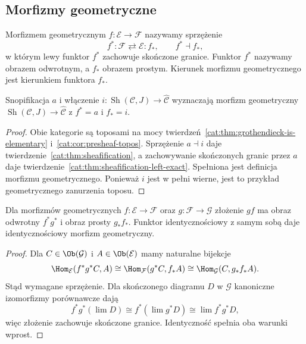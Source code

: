 \subsection{Morfizmy geometryczne}

\begin{definicja}\label{cat:def:geometric-morphism}
Morfizmem geometrycznym $f:\mathcal E\to\mathcal F$ nazywamy sprzężenie
\[
 f^*:\mathcal F\rightleftarrows\mathcal E:f_*,
 \qquad f^*\dashv f_*,
\]
w którym lewy funktor $f^*$ zachowuje skończone granice. Funktor $f^*$ nazywamy obrazem odwrotnym, a $f_*$ obrazem prostym. Kierunek morfizmu geometrycznego jest kierunkiem funktora $f_*$.
\end{definicja}

\begin{center}
\end{center}

\begin{stwierdzenie}\label{cat:prop:sheaf-geometric-inclusion}
Snopifikacja $a$ i włączenie $i:\operatorname{Sh}(\mathcal C,J)\to\widehat{\mathcal C}$ wyznaczają morfizm geometryczny $\operatorname{Sh}(\mathcal C,J)\to\widehat{\mathcal C}$ z $f^*=a$ i $f_*=i$.
\end{stwierdzenie}
\begin{proof}
Obie kategorie są toposami na mocy twierdzeń~\ref{cat:thm:grothendieck-is-elementary} i~\ref{cat:cor:presheaf-topos}. Sprzężenie $a\dashv i$ daje twierdzenie~\ref{cat:thm:sheafification}, a zachowywanie skończonych granic przez $a$ daje twierdzenie~\ref{cat:thm:sheafification-left-exact}. Spełniona jest definicja morfizmu geometrycznego. Ponieważ $i$ jest w pełni wierne, jest to przykład geometrycznego zanurzenia toposu.
\end{proof}

\begin{stwierdzenie}\label{cat:prop:geometric-composition}
Dla morfizmów geometrycznych $f:\mathcal E\to\mathcal F$ oraz $g:\mathcal F\to\mathcal G$ złożenie $gf$ ma obraz odwrotny $f^*g^*$ i obraz prosty $g_*f_*$. Funktor identycznościowy z samym sobą daje identycznościowy morfizm geometryczny.
\end{stwierdzenie}
\begin{proof}
Dla $C\in\Ob(\mathcal G)$ i $A\in\Ob(\mathcal E)$ mamy naturalne bijekcje
\[
 \Hom_{\mathcal E}(f^*g^*C,A)
 \cong\Hom_{\mathcal F}(g^*C,f_*A)
 \cong\Hom_{\mathcal G}(C,g_*f_*A).
\]
Stąd wymagane sprzężenie. Dla skończonego diagramu $D$ w $\mathcal G$ kanoniczne izomorfizmy porównawcze dają
\[
 f^*g^*(\lim D)\cong f^*(\lim g^*D)\cong\lim f^*g^*D,
\]
więc złożenie zachowuje skończone granice. Identyczność spełnia oba warunki wprost.
\end{proof}

